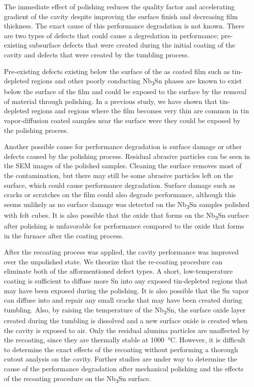 \documentclass[reprint,amsmath,amssymb,aps]{revtex4-2}%
\begin{document}
The immediate effect of polishing reduces the quality factor and accelerating gradient of the cavity despite improving the surface finish and decreasing film thickness. The exact cause of this performance degradation is not known. There are two types of defects that could cause a degredation in performance; pre-existing subsurface defects that were created during the initial coating of the cavity and defects that were created by the tumbling process.

Pre-existing defects existing below the surface of the as coated film such as tin-depleted regions\cite{lee2018atomic} and other poorly conducting Nb\textsubscript{3}Sn phases are known to exist below the surface of the film and could be exposed to the surface by the removal of material through polishing. In a previous study, we have shown that tin-depleted regions and regions where the film becomes very thin are common in tin vapor-diffusion coated samples near the surface were they could be exposed by the polishing process\cite{10073616}. 

Another possible cause for performance degradation is surface damage or other defects caused by the polishing process. Residual abrasive particles can be seen in the SEM images of the polished samples. Cleaning the surface removes most of the contamination, but there may still be some abrasive particles left on the surface, which could cause performance degradation. Surface damage such as cracks or scratches on the film could also degrade performance, although this seems unlikely as no surface damage was detected on the Nb\textsubscript{3}Sn samples polished with felt cubes. It is also possible that the oxide that forms on the Nb\textsubscript{3}Sn surface after polishing is unfavorable for performance compared to the oxide that forms in the furnace after the coating process.

After the recoating process was applied, the cavity performance was improved over the unpolished state. We theorize that the re-coating procedure can eliminate both of the afformentioned defect types. A short, low-temperature coating is sufficient to diffuse more Sn into any exposed tin-depleted regions that may have been exposed during the polishing. It is also possible that the Sn vapor can diffuse into and repair any small cracks that may have been created during tumbling. Also, by raising the temperature of the Nb\textsubscript{3}Sn, the surface oxide layer created during the tumbling is dissolved and a new surface oxide is created when the cavity is exposed to air. Only the residual alumina particles are unaffected by the recoating, since they are thermally stable at 1000~\unit{\celsius}. However, it is difficult to determine the exact effects of the recoating without performing a thorough cutout analysis on the cavity. Further studies are under way to determine the cause of the performance degradation after mechanical polishing and the effects of the recoating procedure on the Nb\textsubscript{3}Sn surface.
\end{document}
